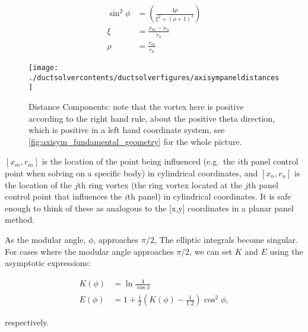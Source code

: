 \begin{equation}
	\label{eqn:normalizedgeom}
	\begin{aligned}
		\sin^2 \phi &= \left( \frac{4\rho}{\xi^2 + (\rho+1)^2} \right) \\%
		\xi &= \frac{x_m - x_n}{r_n} \\
		\rho &= \frac{r_m}{r_n}
	\end{aligned}
\end{equation}

\begin{figure}[h!]
	\centering
	\texttt{[image: ./ductsolvercontents/ductsolverfigures/axisympaneldistances]}
	\caption{Distance Components: note that the vortex here is positive according to the right hand rule, about the positive theta direction, which is positive in a left hand coordinate system, see \cref{fig:axisym_fundamental_geometry} for the whole picture.}
	\label{fig:axisym_panel_distances}
\end{figure}

\where \([x_m, r_m]\) is the location of the point being influenced (e.g.~the \(i\)th panel control point when solving on a specific body) in cylindrical coordinates, and \([x_n,r_n]\) is the location of the \(j\)th ring vortex (the ring vortex located at the \(j\)th panel control point that influences the \(i\)th panel) in cylindrical coordinates.
It is safe enough to think of these as analogous to the [x,y] coordinates in a planar panel method.


As the modular angle, \(\phi\), approaches \(\pi/2\), The elliptic integrals become singular.
For cases where the modular angle approaches \(\pi/2\), we can set \(K\) and \(E\) using the asymptotic expressions:%

\begin{equation}
	\begin{aligned}
		K(\phi) &= \ln \frac{4}{\cos \phi} \\
		E(\phi) &= 1 + \frac{1}{2} \left( K(\phi) - \frac{1}{1.2}\right) \cos^2 \phi,
	\end{aligned}
\end{equation}

\noindent respectively.

%
%


